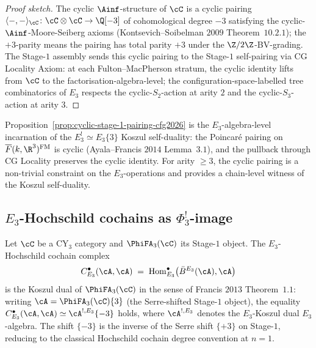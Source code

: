 \begin{proof}[Proof sketch]
The cyclic $\Ainf$-structure of $\cC$ is a cyclic pairing
$\langle -, - \rangle_\cC \colon \cC \otimes \cC \to \Q[-3]$ of
cohomological degree $-3$ satisfying the cyclic-$\Ainf$-Moore-Seiberg
axioms (Kontsevich--Soibelman $2009$ Theorem~$10.2.1$); the
$+3$-parity means the pairing has total parity $+3$ under the
$\Z/2\Z$-BV-grading. The Stage-$1$ assembly sends this cyclic pairing
to the Stage-$1$ self-pairing via CG Locality Axiom: at each
Fulton--MacPherson stratum, the cyclic identity lifts from $\cC$ to
the factorisation-algebra-level; the configuration-space-labelled
tree combinatorics of $E_3$ respects the cyclic-$S_2$-action at
arity $2$ and the cyclic-$S_3$-action at arity $3$.
\end{proof}

\begin{remark}
\label{rem:stage-1-pairing-e3-cyclic-cfg2026}
Proposition~\textup{\ref{prop:cyclic-stage-1-pairing-cfg2026}} is the
$E_3$-algebra-level incarnation of the $E_3^! \simeq E_3\{3\}$ Koszul
self-duality: the Poincar\'e pairing on
$\overline{F}(k, \R^3)^{\mathrm{FM}}$ is cyclic (Ayala--Francis $2014$
Lemma~$3.1$), and the pullback through CG Locality preserves the
cyclic identity. For arity $\geq 3$, the cyclic pairing is a
non-trivial constraint on the $E_3$-operations and provides a
chain-level witness of the Koszul self-duality.
\end{remark}

\subsection*{$E_3$-Hochschild cochains as $\Phi_3^{!}$-image}

\begin{proposition}
\label{prop:e3-hoch-koszul-dual-stage-1-cfg2026}
\ClaimStatusProvedHere
Let $\cC$ be a CY$_3$ category and $\PhiFA_3(\cC)$ its Stage-$1$
object. The $E_3$-Hochschild cochain complex
\[
  C^\bullet_{E_3}(\cA, \cA)
  \;=\; \mathrm{Hom}^\bullet_{E_3}\bigl(\bar{B}^{E_3}(\cA), \cA\bigr)
\]
is the Koszul dual of $\PhiFA_3(\cC)$ in the sense of
Francis $2013$ Theorem~$1.1$: writing
$\cA = \PhiFA_3(\cC) \{3\}$ (the Serre-shifted Stage-$1$ object), the
equality
$C^\bullet_{E_3}(\cA, \cA) \simeq \cA^{!, E_3} \{-3\}$ holds, where
$\cA^{!, E_3}$ denotes the $E_3$-Koszul dual $E_3$-algebra. The shift
$\{-3\}$ is the inverse of the Serre shift $\{+3\}$ on Stage-$1$,
reducing to the classical Hochschild cochain degree convention at
$n = 1$.
\end{proposition}

